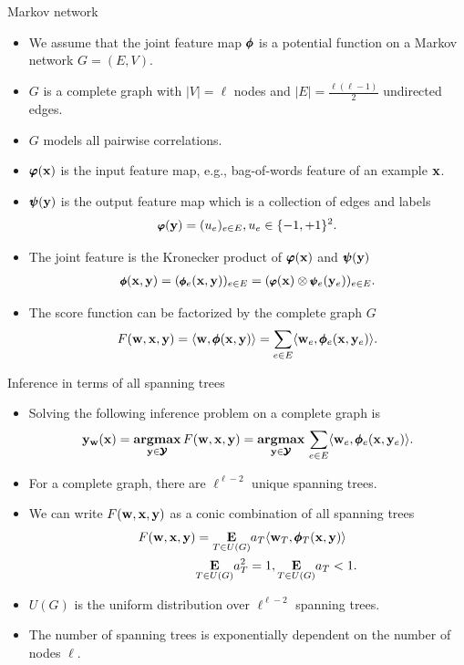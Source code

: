 \documentclass[first=dgreen,second=purple,logo=yellowexc]{aaltoslides}
\begin{document}
\begin{frame}{Markov network}
	\begin{itemize}\footnotesize
		\item We assume that the joint feature map $\pmb \phi$ is a potential function on a Markov network $G=(E,V)$.
		\item $G$ is a complete graph with $|V| = \ell$ nodes and $|E| = \frac{\ell(\ell-1)}{2}$ undirected edges.
		\item $G$ models all pairwise correlations.
		\item $\pmb \varphi(\mathbf {x})$ is the input feature map, e.g., bag-of-words feature of an example $\mathbf {x}$.
		\item $\pmb \psi(\mathbf {y})$ is the output feature map which is a collection of edges and labels
		\begin{align*}\footnotesize
			\pmb \varphi(\mathbf {y}) = (u_{e})_{e\in E},u_e\in\{-1,+1\}^2.
		\end{align*}
		\item The joint feature is the Kronecker product of $\pmb \varphi(\mathbf {x})$ and $\pmb \psi(\mathbf {y})$
		\begin{align*}\footnotesize
			\pmb \phi(\mathbf {x},\mathbf {y}) = (\pmb \phi_e(\mathbf {x},\mathbf {y}))_{e\in E}=(\pmb \varphi(\mathbf {x})\otimes\pmb \psi_e(\mathbf {y}_e))_{e\in E}.
		\end{align*}
		\item The score function can be factorized by the complete graph $G$
		\begin{align*}
			F(\mathbf {w},\mathbf {x},\mathbf {y}) = \langle \mathbf {w}, \pmb \phi(\mathbf {x},\mathbf {y}) \rangle = \sum_{e\in E}\langle \mathbf {w}_e, \pmb \phi_e(\mathbf {x},\mathbf {y}_e) \rangle.
		\end{align*}
	\end{itemize}
\end{frame}

\begin{frame}{Inference in terms of all spanning trees}
	\begin{itemize}
		\item Solving the following inference problem on a complete graph is \nphard
		\begin{align*}
			\mathbf {y}_{\mathbf {w}}(\mathbf {x}) = \underset{\mathbf {y}\in\pmb {\mathcal{Y}}}{\textbf{argmax}}\,F(\mathbf {w},\mathbf {x},\mathbf {y})  = \underset{\mathbf {y}\in\pmb {\mathcal{Y}}}{\textbf{argmax}}\,\sum_{e\in E}\langle \mathbf {w}_e, \pmb \phi_e(\mathbf {x},\mathbf {y}_e) \rangle. 
		\end{align*}
		\item For a complete graph, there are $\ell^{\ell-2}$ unique spanning trees.
		\item We can write $F(\mathbf {w},\mathbf {x},\mathbf {y})$ as a conic combination of all spanning trees
		\begin{align*}
			F(\mathbf {w},\mathbf {x},\mathbf {y}) &= \underset{T\in U(G)}{\textbf{E}}a_T\langle \mathbf {w}_T, \pmb \phi_T(\mathbf {x},\mathbf {y}) \rangle\\
			  &\underset{T\in U(G)}{\textbf{E}}a_T^2=1,  \underset{T\in U(G)}{\textbf{E}}a_T<1.
		\end{align*}
		\item $U(G)$ is the uniform distribution over $\ell^{\ell-2}$ spanning trees.
		\item The number of spanning trees is exponentially dependent on the number of nodes $\ell$.
	\end{itemize}
\end{frame}
\end{document}
